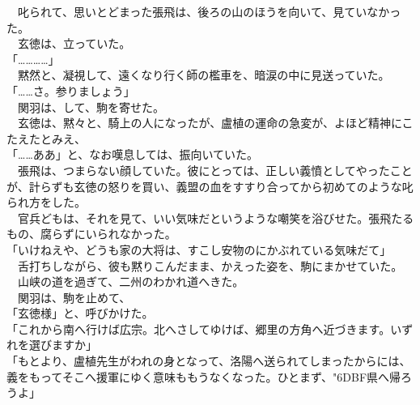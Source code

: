 \documentclass[
  paper=a5,
  fontsize=10pt,
  jafontsize=9.5pt,
  tate,                  %
  open_bracket_pos=nibu, %
]{jlreq}
\begin{document}
　叱られて、思いとどまった張飛は、後ろの山のほうを向いて、見ていなかった。\\


　玄徳は、立っていた。\\


「…………」\\


　黙然と、凝視して、遠くなり行く師の檻車を、暗涙の中に見送っていた。\\


「……さ。参りましょう」\\


　関羽は、して、駒を寄せた。\\


　玄徳は、黙々と、騎上の人になったが、盧植の運命の急変が、よほど精神にこたえたとみえ、\\


「……ああ」と、なお嘆息しては、振向いていた。\\


　張飛は、つまらない顔していた。彼にとっては、正しい義憤としてやったことが、計らずも玄徳の怒りを買い、義盟の血をすすり合ってから初めてのような叱られ方をした。\\


　官兵どもは、それを見て、いい気味だというような嘲笑を浴びせた。張飛たるもの、腐らずにいられなかった。\\


「いけねえや、どうも家の大将は、すこし安物のにかぶれている気味だて」\\


　舌打ちしながら、彼も黙りこんだまま、かえった姿を、駒にまかせていた。\\


　山峡の道を過ぎて、二州のわかれ道へきた。\\


　関羽は、駒を止めて、\\


「玄徳様」と、呼びかけた。\\


「これから南へ行けば広宗。北へさしてゆけば、郷里の方角へ近づきます。いずれを選びますか」\\


「もとより、盧植先生がわれの身となって、洛陽へ送られてしまったからには、義をもってそこへ援軍にゆく意味ももうなくなった。ひとまず、{\char"6DBF}県へ帰ろうよ」\\
\end{document}
